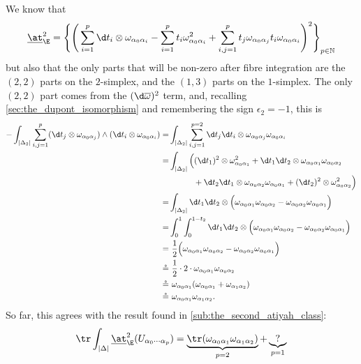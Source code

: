        We know that
        \begin{equation*}
            \underline{\at}_\E^2 = \Bigg\{\Bigg(\sum_{i=1}^p\d t_i\otimes\omega_{\alpha_0\alpha_i} - \sum_{i=1}^pt_i\omega_{\alpha_0\alpha_i}^2 + \sum_{i,j=1}^p t_j\omega_{\alpha_0\alpha_j}t_i\omega_{\alpha_0\alpha_i}\Bigg)^2\Bigg\}_{p\in\mathbb{N}}
        \end{equation*}
        but also that the only parts that will be non-zero after fibre integration are the $(2,2)$ parts on the $2$-simplex, and the $(1,3)$ parts on the $1$-simplex.
        The only $(2,2)$ part comes from the $(\d\overline\omega)^2$ term, and, recalling \cref{sec:the_dupont_isomorphism} and remembering the sign $\epsilon_2=-1$, this is
        \begin{align*}
            -\int_{|\Delta_2|}\sum_{i,j=1}^p (\d t_j\otimes\omega_{\alpha_0\alpha_j}) \wedge (\d t_i\otimes\omega_{\alpha_0\alpha_i}) = &\int_{|\Delta_2|}\sum_{i,j=1}^{p=2} \d t_j\d t_i\otimes\omega_{\alpha_0\alpha_j}\omega_{\alpha_0\alpha_i}\\
            = &\int_{|\Delta_2|}\Big((\d t_1)^2\otimes\omega_{\alpha_0\alpha_1}^2 + \d t_1\d t_2\otimes\omega_{\alpha_0\alpha_1}\omega_{\alpha_0\alpha_2}\\
            &\qquad\quad+ \d t_2\d t_1\otimes\omega_{\alpha_0\alpha_2}\omega_{\alpha_0\alpha_1} + (\d t_2)^2\otimes\omega_{\alpha_0\alpha_2}^2\Big)\\
            = &\int_{|\Delta_2|} \d t_1\d t_2\otimes\Big(\omega_{\alpha_0\alpha_1}\omega_{\alpha_0\alpha_2} - \omega_{\alpha_0\alpha_2}\omega_{\alpha_0\alpha_1}\Big)\\
            = &\int_0^1\int_0^{1-t_2} \d t_1\d t_2\otimes\Big(\omega_{\alpha_0\alpha_1}\omega_{\alpha_0\alpha_2} - \omega_{\alpha_0\alpha_2}\omega_{\alpha_0\alpha_1}\Big)\\
            = &\,\,\frac12\Big(\omega_{\alpha_0\alpha_1}\omega_{\alpha_0\alpha_2} - \omega_{\alpha_0\alpha_2}\omega_{\alpha_0\alpha_1}\Big)\\
            \circeq&\,\, \frac{1}{2}\cdot2\cdot\omega_{\alpha_0\alpha_1}\omega_{\alpha_0\alpha_2}\\
            \circeq&\,\, \omega_{\alpha_0\alpha_1}(\omega_{\alpha_0\alpha_1}+\omega_{\alpha_1\alpha_2})\\
            \circeq&\,\, \omega_{\alpha_0\alpha_1}\omega_{\alpha_1\alpha_2}.
        \end{align*}
        So far, this agrees with the result found in \cref{sub:the_second_atiyah_class}:
        \begin{equation}
            \tr\int_{|\Delta|}\underline{\at}_\E^2(U_{\alpha_0\cdots\alpha_p}) = \underbrace{\tr(\omega_{\alpha_0\alpha_1}\omega_{\alpha_1\alpha_2})}_{p=2} + \underbrace{?}_{p=1}
        \end{equation}

